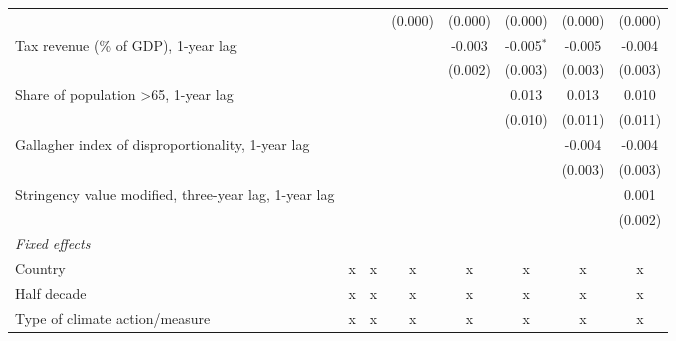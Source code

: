 \begin{tabular}{lccccccc}
                                                                                          &         &             & (0.000)      & (0.000)      & (0.000)       & (0.000)       & (0.000)\\   
   Tax revenue (\% of GDP), 1-year lag                                                    &         &             &              & -0.003       & -0.005$^{*}$  & -0.005        & -0.004\\   
                                                                                          &         &             &              & (0.002)      & (0.003)       & (0.003)       & (0.003)\\   
   Share of population >65, 1-year lag                                                    &         &             &              &              & 0.013         & 0.013         & 0.010\\   
                                                                                          &         &             &              &              & (0.010)       & (0.011)       & (0.011)\\   
   Gallagher index of disproportionality, 1-year lag                                      &         &             &              &              &               & -0.004        & -0.004\\   
                                                                                          &         &             &              &              &               & (0.003)       & (0.003)\\   
   Stringency value modified, three-year lag, 1-year lag                                  &         &             &              &              &               &               & 0.001\\   
                                                                                          &         &             &              &              &               &               & (0.002)\\   
   \emph{Fixed effects}\\
   Country                                                                                & x       & x           & x            & x            & x             & x             & x\\  
   Half decade                                                                            & x       & x           & x            & x            & x             & x             & x\\  
   Type of climate action/measure                                                         & x       & x           & x            & x            & x             & x             & x\\  

\end{tabular}
